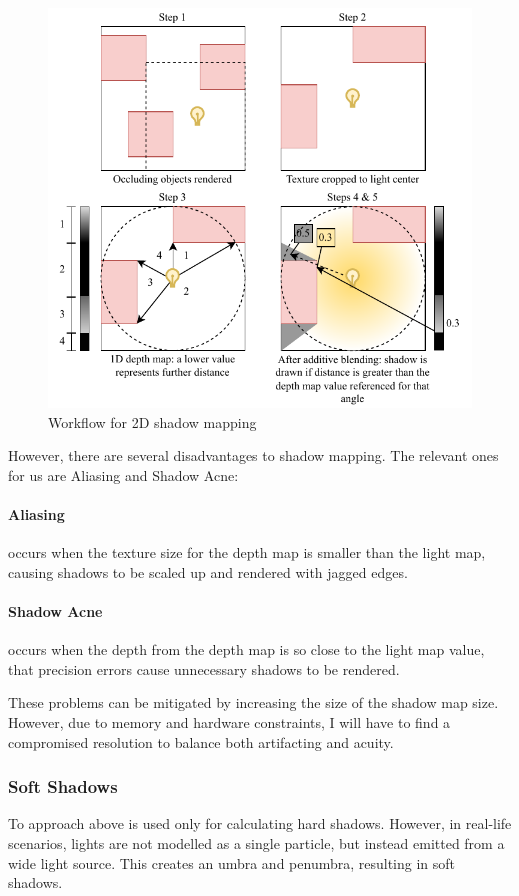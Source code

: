 \documentclass[../main/main.tex]{subfiles}
\begin{document}
\begin{figure}[H]
    \centering
    \includegraphics[width=0.6\columnwidth]{../design/assets/shadow_mapping.pdf}
    \caption{Workflow for 2D shadow mapping}
    \label{fig:shadow-mapping}
\end{figure}

However, there are several disadvantages to shadow mapping. The relevant ones for us are Aliasing and Shadow Acne:

\paragraph{Aliasing} occurs when the texture size for the depth map is smaller than the light map, causing shadows to be scaled up and rendered with jagged edges.

\paragraph{Shadow Acne} occurs when the depth from the depth map is so close to the light map value, that precision errors cause unnecessary shadows to be rendered.

\bigskip

\noindent These problems can be mitigated by increasing the size of the shadow map size. However, due to memory and hardware constraints, I will have to find a compromised resolution to balance both artifacting and acuity.

\subsubsection*{Soft Shadows}
To approach above is used only for calculating hard shadows. However, in real-life scenarios, lights are not modelled as a single particle, but instead emitted from a wide light source. This creates an umbra and penumbra, resulting in soft shadows.
\end{document}
